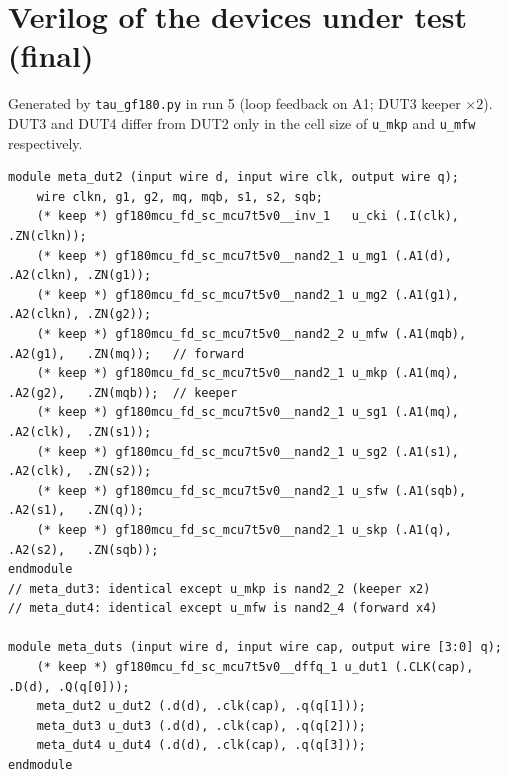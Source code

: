 \documentclass[11pt]{article}
\begin{document}
\appendix
\section{Verilog of the devices under test (final)}
\label{app:verilog}
Generated by \texttt{tau\_gf180.py} in run 5 (loop feedback on A1; DUT3 keeper $\times2$). DUT3 and DUT4 differ from
DUT2 only in the cell size of \texttt{u\_mkp} and \texttt{u\_mfw} respectively.
\begin{lstlisting}
module meta_dut2 (input wire d, input wire clk, output wire q);
    wire clkn, g1, g2, mq, mqb, s1, s2, sqb;
    (* keep *) gf180mcu_fd_sc_mcu7t5v0__inv_1   u_cki (.I(clk), .ZN(clkn));
    (* keep *) gf180mcu_fd_sc_mcu7t5v0__nand2_1 u_mg1 (.A1(d),   .A2(clkn), .ZN(g1));
    (* keep *) gf180mcu_fd_sc_mcu7t5v0__nand2_1 u_mg2 (.A1(g1),  .A2(clkn), .ZN(g2));
    (* keep *) gf180mcu_fd_sc_mcu7t5v0__nand2_2 u_mfw (.A1(mqb), .A2(g1),   .ZN(mq));   // forward
    (* keep *) gf180mcu_fd_sc_mcu7t5v0__nand2_1 u_mkp (.A1(mq),  .A2(g2),   .ZN(mqb));  // keeper
    (* keep *) gf180mcu_fd_sc_mcu7t5v0__nand2_1 u_sg1 (.A1(mq),  .A2(clk),  .ZN(s1));
    (* keep *) gf180mcu_fd_sc_mcu7t5v0__nand2_1 u_sg2 (.A1(s1),  .A2(clk),  .ZN(s2));
    (* keep *) gf180mcu_fd_sc_mcu7t5v0__nand2_1 u_sfw (.A1(sqb), .A2(s1),   .ZN(q));
    (* keep *) gf180mcu_fd_sc_mcu7t5v0__nand2_1 u_skp (.A1(q),   .A2(s2),   .ZN(sqb));
endmodule
// meta_dut3: identical except u_mkp is nand2_2 (keeper x2)
// meta_dut4: identical except u_mfw is nand2_4 (forward x4)

module meta_duts (input wire d, input wire cap, output wire [3:0] q);
    (* keep *) gf180mcu_fd_sc_mcu7t5v0__dffq_1 u_dut1 (.CLK(cap), .D(d), .Q(q[0]));
    meta_dut2 u_dut2 (.d(d), .clk(cap), .q(q[1]));
    meta_dut3 u_dut3 (.d(d), .clk(cap), .q(q[2]));
    meta_dut4 u_dut4 (.d(d), .clk(cap), .q(q[3]));
endmodule
\end{lstlisting}

\end{document}
